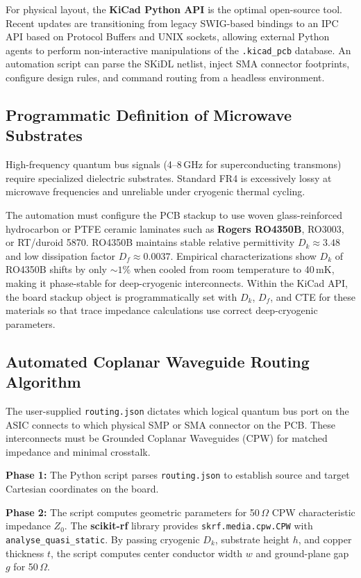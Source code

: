 \documentclass[11pt, a4paper]{article}
\begin{document}
For physical layout, the \textbf{KiCad Python API} is the optimal open-source tool. Recent updates are transitioning from legacy SWIG-based bindings to an IPC API based on Protocol Buffers and UNIX sockets, allowing external Python agents to perform non-interactive manipulations of the \texttt{.kicad\_pcb} database. An automation script can parse the SKiDL netlist, inject SMA connector footprints, configure design rules, and command routing from a headless environment.

\subsection{Programmatic Definition of Microwave Substrates}

High-frequency quantum bus signals (4--8\,GHz for superconducting transmons) require specialized dielectric substrates. Standard FR4 is excessively lossy at microwave frequencies and unreliable under cryogenic thermal cycling.

The automation must configure the PCB stackup to use woven glass-reinforced hydrocarbon or PTFE ceramic laminates such as \textbf{Rogers RO4350B}, RO3003, or RT/duroid 5870. RO4350B maintains stable relative permittivity $D_k \approx 3.48$ and low dissipation factor $D_f \approx 0.0037$. Empirical characterizations show $D_k$ of RO4350B shifts by only $\sim 1\%$ when cooled from room temperature to 40\,mK, making it phase-stable for deep-cryogenic interconnects. Within the KiCad API, the board stackup object is programmatically set with $D_k$, $D_f$, and CTE for these materials so that trace impedance calculations use correct deep-cryogenic parameters.

\subsection{Automated Coplanar Waveguide Routing Algorithm}

The user-supplied \texttt{routing.json} dictates which logical quantum bus port on the ASIC connects to which physical SMP or SMA connector on the PCB. These interconnects must be Grounded Coplanar Waveguides (CPW) for matched impedance and minimal crosstalk.

\textbf{Phase 1:} The Python script parses \texttt{routing.json} to establish source and target Cartesian coordinates on the board.

\textbf{Phase 2:} The script computes geometric parameters for 50\,$\Omega$ CPW characteristic impedance $Z_0$. The \textbf{scikit-rf} library provides \texttt{skrf.media.cpw.CPW} with \texttt{analyse\_quasi\_static}. By passing cryogenic $D_k$, substrate height $h$, and copper thickness $t$, the script computes center conductor width $w$ and ground-plane gap $g$ for 50\,$\Omega$.
\end{document}
